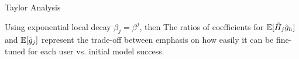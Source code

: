 \documentclass{beamer}
\begin{document}
\begin{frame}[allowframebreaks]{Taylor Analysis}
    

\framebreak
    Using exponential local decay $\beta_j = \beta^j$, then 
    \medskip
    The ratios of coefficients for $\mathbb{E} [ \Tilde{H}_j \Tilde{g}_h ]$ and $\mathbb{E} [ \Tilde{g}_j ]$ represent the trade-off between emphasis on how easily it can be fine-tuned for each user vs. initial model success.
    
\end{frame}
\end{document}
